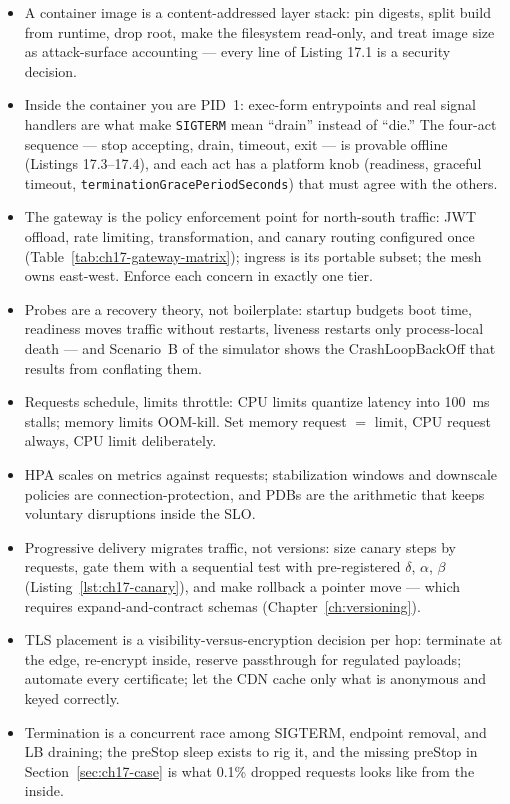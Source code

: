 \begin{itemize}
  \item A container image is a content-addressed layer stack: pin digests,
        split build from runtime, drop root, make the filesystem
        read-only, and treat image size as attack-surface accounting ---
        every line of Listing 17.1 is a security decision.
  \item Inside the container you are PID~1: exec-form entrypoints and
        real signal handlers are what make \texttt{SIGTERM} mean
        ``drain'' instead of ``die.'' The four-act sequence --- stop
        accepting, drain, timeout, exit --- is provable offline
        (Listings 17.3--17.4), and each act has a platform knob
        (readiness, graceful timeout, \texttt{terminationGracePeriodSeconds})
        that must agree with the others.
  \item The gateway is the policy enforcement point for north-south
        traffic: JWT offload, rate limiting, transformation, and canary
        routing configured once (Table~\ref{tab:ch17-gateway-matrix});
        ingress is its portable subset; the mesh owns east-west. Enforce
        each concern in exactly one tier.
  \item Probes are a recovery theory, not boilerplate: startup budgets
        boot time, readiness moves traffic without restarts, liveness
        restarts only process-local death --- and Scenario~B of the
        simulator shows the CrashLoopBackOff that results from conflating
        them.
  \item Requests schedule, limits throttle: CPU limits quantize latency
        into 100~ms stalls; memory limits OOM-kill. Set memory request
        $=$ limit, CPU request always, CPU limit deliberately.
  \item HPA scales on metrics against requests; stabilization windows and
        downscale policies are connection-protection, and PDBs are the
        arithmetic that keeps voluntary disruptions inside the SLO.
  \item Progressive delivery migrates traffic, not versions: size canary
        steps by requests, gate them with a sequential test with
        pre-registered $\delta$, $\alpha$, $\beta$
        (Listing~\ref{lst:ch17-canary}), and make rollback a pointer
        move --- which requires expand-and-contract schemas
        (Chapter~\ref{ch:versioning}).
  \item TLS placement is a visibility-versus-encryption decision per
        hop: terminate at the edge, re-encrypt inside, reserve
        passthrough for regulated payloads; automate every certificate;
        let the CDN cache only what is anonymous and keyed correctly.
  \item Termination is a concurrent race among SIGTERM, endpoint removal,
        and LB draining; the preStop sleep exists to rig it, and the
        missing preStop in Section~\ref{sec:ch17-case} is what 0.1\%
        dropped requests looks like from the inside.
\end{itemize}

